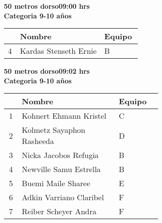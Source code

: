\begin{minipage}{0.95\linewidth}\vspace{0.5cm} 
\begin{flushleft}
\textbf{
\hspace{-0.15cm}50 metros dorso\hspace{1.5cm}09:00 hrs \\Categoria 9-10 años}\vspace{-0.2cm} 
\end{flushleft}
\begin{tabular}{cp{0.63\linewidth}l}
\hline
& \textbf{Nombre} & \textbf{Equipo} \\ \hline
4 & Kardas Stenseth Ernie & B \\ 
\end{tabular}
\end{minipage}
\begin{minipage}{0.95\linewidth}\vspace{0.5cm} 
\begin{flushleft}
\textbf{
\hspace{-0.15cm}50 metros dorso\hspace{1.5cm}09:02 hrs \\Categoria 9-10 años}\vspace{-0.2cm} 
\end{flushleft}
\begin{tabular}{cp{0.63\linewidth}l}
\hline
& \textbf{Nombre} & \textbf{Equipo} \\ \hline
1 & Kohnert Ehmann Kristel & C \\ 
2 & Kolmetz Sayaphon Rasheeda & D \\ 
3 & Nicka Jacobos Refugia & B \\ 
4 & Newville Samu Estrella & B \\ 
5 & Buemi Maile Sharee & E \\ 
6 & Adkin Varriano Claribel & F \\ 
7 & Reiber Scheyer Andra & F \\ 
\end{tabular}
\end{minipage}
